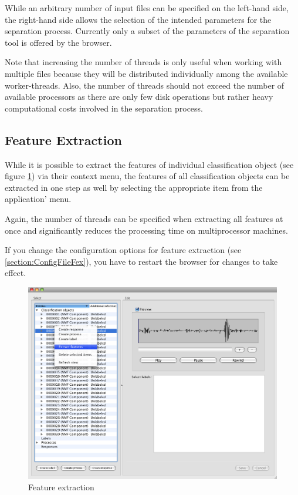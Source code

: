 While an arbitrary number of input files can be specified on the left-hand side,
the right-hand side allows the selection of the intended parameters for the
separation process. Currently only a subset of the parameters of the separation
tool is offered by the browser.

Note that increasing the number of threads is only useful when working with
multiple files because they will be distributed individually among the available
worker-threads. Also, the number of threads should not exceed the number of
available processors as there are only few disk operations but rather heavy
computational costs involved in the separation process.


\subsection{Feature Extraction}

While it is possible to extract the features of individual classification object
(see figure \ref{figure:FeatureExtraction}) via their context menu, the features
of all classification objects can be extracted in one step as well by selecting
the appropriate item from the application' menu.

Again, the number of threads can be specified when extracting all features at
once and significantly reduces the processing time on multiprocessor machines.

\begin{leftbar}
    If you change the configuration options for feature extraction (see
    \ref{section:ConfigFileFex}), you have to restart the browser for changes to
    take effect.
\end{leftbar}

\begin{figure}
    \includegraphics[width=\textwidth]{images/FeatureExtraction.png}
    \caption{%
        \label{figure:FeatureExtraction}%
        Feature extraction
    }
\end{figure}



